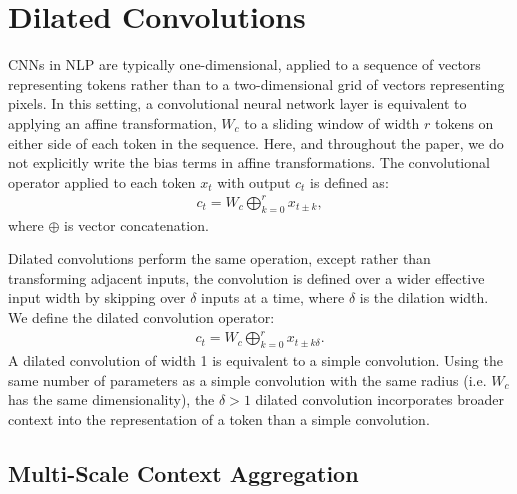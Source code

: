 \section{Dilated Convolutions}


CNNs in NLP are typically one-dimensional, applied to a sequence of vectors representing tokens rather than to a two-dimensional grid of vectors representing pixels. In this setting, a convolutional neural network layer is equivalent to applying an affine transformation, $W_c$ to a sliding window of width $r$ tokens on either side of each token in the sequence. Here, and throughout the paper, we do not explicitly write the bias terms in affine transformations. The convolutional operator applied to each token $x_t$ with output $c_t$ is defined as:
\begin{align}
c_t = W_c\bigoplus_{k=0}^{r}x_{t \pm k},
\end{align}
where $\oplus$ is vector concatenation.

Dilated convolutions perform the same operation, except rather than transforming adjacent inputs, the convolution is defined over a wider effective input width by skipping over $\delta$ inputs at a time, where $\delta$ is the dilation width. We define the dilated convolution operator:
\begin{align}
c_t = W_c\bigoplus_{k=0}^{r}x_{t \pm k\delta}.
\end{align}
A dilated convolution of width 1 is equivalent to a simple convolution. Using the same number of parameters as a simple convolution with the same radius (i.e. $W_c$ has the same dimensionality), the $\delta > 1$ dilated convolution incorporates broader context into the representation of a token than a simple convolution. 


\subsection{Multi-Scale Context Aggregation}



